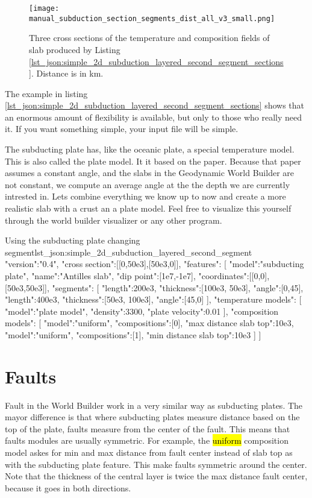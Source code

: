 \documentclass{book}
\newcommand{\GWB}{{Geodynamic World Builder}}
\newcommand{\WB}{{World Builder}}
\begin{document}
\begin{figure}
    \centering
    \texttt{[image: manual\_subduction\_section\_segments\_dist\_all\_v3\_small.png]}
    \caption{Three cross sections of the temperature and composition fields of slab produced by Listing \ref{lst_json:simple_2d_subduction_layered_second_segment_sections}. Distance is in km.}
    \label{fig:simple_2d_subduction_3}
\end{figure}

The example in listing \ref{lst_json:simple_2d_subduction_layered_second_segment_sections} shows that an enormous amount of flexibility is available, but only to those who really need it. If you want something simple, your input file will be simple.

The subducting plate has, like the oceanic plate, a special temperature model. This is also called the plate model. It it based on the \cite{mckenzie1970} paper. Because that paper assumes a constant angle, and the slabs in the \GWB{} are not constant, we compute an average angle at the the depth we are currently intrested in. Lets combine everything we know up to now and create a more realistic slab with a crust an a plate model. Feel free to visualize this yourself through the world builder visualizer or any other program.

\begin{javascriptcode}{Using the subducting plate changing segment}{lst_json:simple_2d_subduction_layered_second_segment}
{
  "version":"0.4",
  "cross section":[[0,50e3],[50e3,0]],
  "features":
  [
     {
       "model":"subducting plate", "name":"Antilles slab", "dip point":[1e7,-1e7],
       "coordinates":[[0,0],[50e3,50e3]], 
     "segments":
     [
         {"length":200e3, "thickness":[100e3, 50e3], "angle":[0,45]},
         {"length":400e3, "thickness":[50e3, 100e3], "angle":[45,0]}
     ],
     "temperature models":
     [
       {"model":"plate model", "density":3300, "plate velocity":0.01}
     ],
     "composition models":
     [
       {"model":"uniform", "compositions":[0], "max distance slab top":10e3},
       {"model":"uniform", "compositions":[1], "min distance slab top":10e3}
     ]
    }
  ]
}
\end{javascriptcode}


\section{Faults}
Fault in the \WB{} work in a very similar way as subducting plates. The mayor difference is that where subducting plates measure distance based on the top of the plate, faults measure from the center of the fault. This means that faults modules are usually symmetric. For example, the \hl{uniform} composition model askes for min and max distance from fault center instead of slab top as with the subducting plate feature. This make faults symmetric around the center. Note that the thickness of the central layer is twice the max distance fault center, because it goes in both directions.
\end{document}
